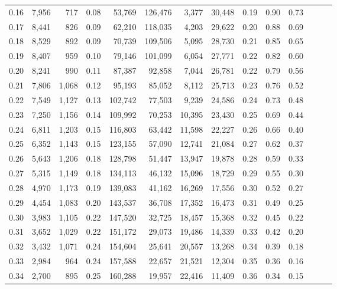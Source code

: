 \begin{tabular}{rrrrrrrrrrrrrr}
0.16 &  7,956 &    717 &  0.08 &   53,769 &  126,476 &   3,377 &  30,448 &  0.19 &  0.90 &      0.73 \\
0.17 &  8,441 &    826 &  0.09 &   62,210 &  118,035 &   4,203 &  29,622 &  0.20 &  0.88 &      0.69 \\
0.18 &  8,529 &    892 &  0.09 &   70,739 &  109,506 &   5,095 &  28,730 &  0.21 &  0.85 &      0.65 \\
0.19 &  8,407 &    959 &  0.10 &   79,146 &  101,099 &   6,054 &  27,771 &  0.22 &  0.82 &      0.60 \\
0.20 &  8,241 &    990 &  0.11 &   87,387 &   92,858 &   7,044 &  26,781 &  0.22 &  0.79 &      0.56 \\
0.21 &  7,806 &  1,068 &  0.12 &   95,193 &   85,052 &   8,112 &  25,713 &  0.23 &  0.76 &      0.52 \\
0.22 &  7,549 &  1,127 &  0.13 &  102,742 &   77,503 &   9,239 &  24,586 &  0.24 &  0.73 &      0.48 \\
0.23 &  7,250 &  1,156 &  0.14 &  109,992 &   70,253 &  10,395 &  23,430 &  0.25 &  0.69 &      0.44 \\
0.24 &  6,811 &  1,203 &  0.15 &  116,803 &   63,442 &  11,598 &  22,227 &  0.26 &  0.66 &      0.40 \\
0.25 &  6,352 &  1,143 &  0.15 &  123,155 &   57,090 &  12,741 &  21,084 &  0.27 &  0.62 &      0.37 \\
0.26 &  5,643 &  1,206 &  0.18 &  128,798 &   51,447 &  13,947 &  19,878 &  0.28 &  0.59 &      0.33 \\
0.27 &  5,315 &  1,149 &  0.18 &  134,113 &   46,132 &  15,096 &  18,729 &  0.29 &  0.55 &      0.30 \\
0.28 &  4,970 &  1,173 &  0.19 &  139,083 &   41,162 &  16,269 &  17,556 &  0.30 &  0.52 &      0.27 \\
0.29 &  4,454 &  1,083 &  0.20 &  143,537 &   36,708 &  17,352 &  16,473 &  0.31 &  0.49 &      0.25 \\
0.30 &  3,983 &  1,105 &  0.22 &  147,520 &   32,725 &  18,457 &  15,368 &  0.32 &  0.45 &      0.22 \\
0.31 &  3,652 &  1,029 &  0.22 &  151,172 &   29,073 &  19,486 &  14,339 &  0.33 &  0.42 &      0.20 \\
0.32 &  3,432 &  1,071 &  0.24 &  154,604 &   25,641 &  20,557 &  13,268 &  0.34 &  0.39 &      0.18 \\
0.33 &  2,984 &    964 &  0.24 &  157,588 &   22,657 &  21,521 &  12,304 &  0.35 &  0.36 &      0.16 \\
0.34 &  2,700 &    895 &  0.25 &  160,288 &   19,957 &  22,416 &  11,409 &  0.36 &  0.34 &      0.15 \\

\end{tabular}
